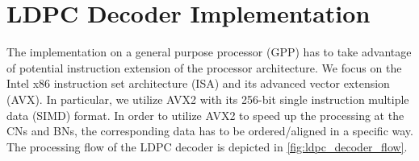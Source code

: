 \documentclass{article}
\begin{document}
\newpage
\section{LDPC Decoder Implementation}
\label{sec:ldpc-implementation}

The implementation on a general purpose processor (GPP) has to take advantage of potential instruction extension of the processor architecture. We focus on the Intel x86 instruction set architecture (ISA) and its advanced vector extension (AVX). In particular, we utilize AVX2 with its 256-bit single instruction multiple data (SIMD) format. In order to utilize AVX2 to speed up the processing at the CNs and BNs, the corresponding data has to be ordered/aligned in a specific way. The processing flow of the LDPC decoder is depicted in \ref{fig:ldpc_decoder_flow}.
\end{document}
